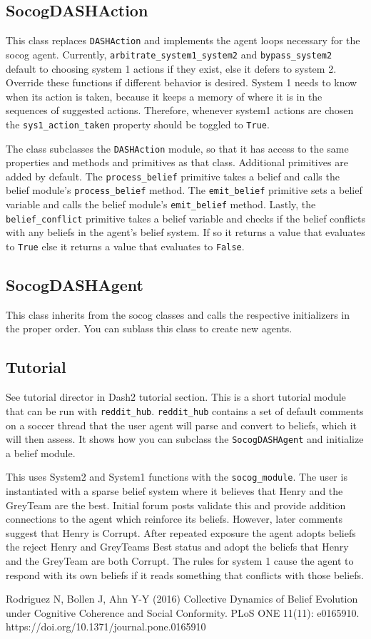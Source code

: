 \documentclass[11pt, a4paper]{article}
\begin{document}
\subsection{SocogDASHAction}

This class replaces \texttt{DASHAction} and implements the agent loops necessary for the socog agent. Currently, \texttt{arbitrate\_system1\_system2} and \texttt{bypass\_system2} default to choosing system 1 actions if they exist, else it defers to system 2. Override these functions if different behavior is desired. System 1 needs to know when its action is taken, because it keeps a memory of where it is in the sequences of suggested actions. Therefore, whenever system1 actions are chosen the \texttt{sys1\_action\_taken} property should be toggled to \texttt{True}.

The class subclasses the \texttt{DASHAction} module, so that it has access to the same properties and methods and primitives as that class. Additional primitives are added by default. The \texttt{process\_belief} primitive takes a belief and calls the belief module's \texttt{process\_belief} method. The \texttt{emit\_belief} primitive sets a belief variable and calls the belief module's \texttt{emit\_belief} method. Lastly, the \texttt{belief\_conflict} primitive takes a belief variable and checks if the belief conflicts with any beliefs in the agent's belief system. If so it returns a value that evaluates to \texttt{True} else it returns a value that evaluates to \texttt{False}.

\subsection{SocogDASHAgent}

This class inherits from the socog classes and calls the respective initializers in the proper order. You can sublass this class to create new agents.

\subsection{Tutorial}
See tutorial director in Dash2 tutorial section. This is a short tutorial module that can be run with \texttt{reddit\_hub}. \texttt{reddit\_hub} contains a set of default comments on a soccer thread that the user agent will parse and convert to beliefs, which it will then assess. It shows how you can subclass the \texttt{SocogDASHAgent} and initialize a belief module.

This uses System2 and System1 functions with the \texttt{socog\_module}. The user is instantiated with a sparse belief system where it believes that Henry and the GreyTeam are the best. Initial forum posts validate this and provide addition connections to the agent which reinforce its beliefs. However, later comments suggest that Henry is Corrupt. After repeated exposure the agent adopts beliefs the reject Henry and GreyTeams Best status and adopt the beliefs that Henry and the GreyTeam are both Corrupt. The rules for system 1 cause the agent to respond with its own beliefs if it reads something that conflicts with those beliefs.



\begin{thebibliography}{1}
 Rodriguez N, Bollen J, Ahn Y-Y (2016) Collective Dynamics of Belief Evolution under Cognitive Coherence and Social Conformity. PLoS ONE 11(11): e0165910. https://doi.org/10.1371/journal.pone.0165910
\end{thebibliography}
\end{document}
